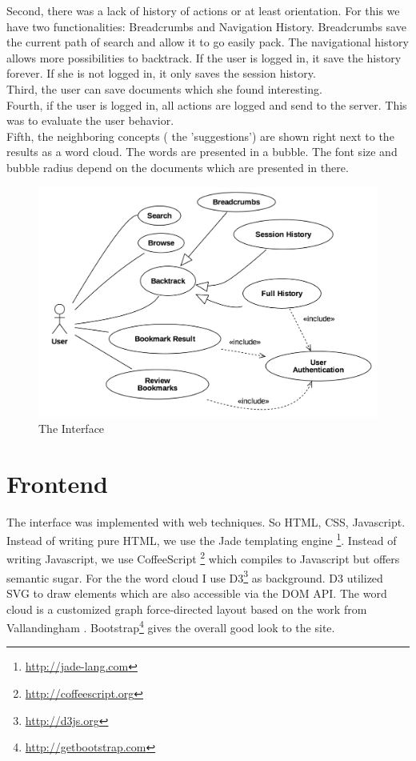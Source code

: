 \documentclass[11pt]{report}
\begin{document}
{{Second, there was a lack of history of actions or at least orientation. For this we have two functionalities: Breadcrumbs and Navigation History. Breadcrumbs save the current path of search and allow it to go easily pack. The navigational history allows more possibilities to backtrack. If the user is logged in, it save the history forever. If she is not logged in, it only saves the session history. \\

Third, the user can save documents which she found interesting. \\

Fourth, if the user is logged in, all actions are logged and send to the server. This was to evaluate the user behavior. \\

Fifth, the neighboring concepts ( the 'suggestions') are shown right next to the results as a word cloud. The words are presented in a bubble. The font size and bubble radius depend on the documents which are presented in there.

\begin{figure}[!ht]
	\centering
	\includegraphics[width=\linewidth]{images/usecase}
\caption{The Interface}
\label{figure:usecase}
\end{figure}

\section{Frontend}

The interface was implemented with web techniques. So HTML, CSS, Javascript. Instead of writing pure HTML, we use the Jade templating engine \footnote{\url{http://jade-lang.com}}. Instead of writing Javascript, we use CoffeeScript \footnote{\url{http://coffeescript.org}} which compiles to Javascript but offers semantic sugar. For the the word cloud I use D3\footnote{\url{http://d3js.org}} \cite{Bostock2011} as background. D3 utilized SVG to draw elements which are also accessible via the DOM API. The word cloud is a customized graph force-directed layout based on the work from Vallandingham \cite{Vallandingham}. Bootstrap\footnote{\url{http://getbootstrap.com}} gives the overall good look to the site.

}}
\end{document}
